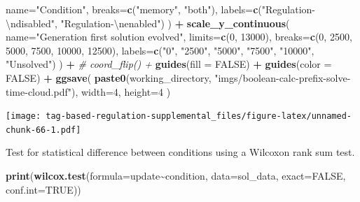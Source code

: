 \documentclass[
]{book}
\newenvironment{Shaded}{\begin{snugshade}}{\end{snugshade}}
\newcommand{\CharTok}[1]{\textcolor[rgb]{0.31,0.60,0.02}{#1}}
\newcommand{\CommentTok}[1]{\textcolor[rgb]{0.56,0.35,0.01}{\textit{#1}}}
\newcommand{\DataTypeTok}[1]{\textcolor[rgb]{0.13,0.29,0.53}{#1}}
\newcommand{\DecValTok}[1]{\textcolor[rgb]{0.00,0.00,0.81}{#1}}
\newcommand{\KeywordTok}[1]{\textcolor[rgb]{0.13,0.29,0.53}{\textbf{#1}}}
\newcommand{\NormalTok}[1]{#1}
\newcommand{\OperatorTok}[1]{\textcolor[rgb]{0.81,0.36,0.00}{\textbf{#1}}}
\newcommand{\OtherTok}[1]{\textcolor[rgb]{0.56,0.35,0.01}{#1}}
\newcommand{\StringTok}[1]{\textcolor[rgb]{0.31,0.60,0.02}{#1}}
\begin{document}
\begin{Shaded}
\begin{Highlighting}[]
    \DataTypeTok{name=}\StringTok{"Condition"}\NormalTok{,}
    \DataTypeTok{breaks=}\KeywordTok{c}\NormalTok{(}\StringTok{"memory"}\NormalTok{, }\StringTok{"both"}\NormalTok{),}
    \DataTypeTok{labels=}\KeywordTok{c}\NormalTok{(}\StringTok{"Regulation{-}}\CharTok{\textbackslash{}n}\StringTok{disabled"}\NormalTok{, }\StringTok{"Regulation{-}}\CharTok{\textbackslash{}n}\StringTok{enabled"}\NormalTok{)}
\NormalTok{  ) }\OperatorTok{+}
\StringTok{  }\KeywordTok{scale\_y\_continuous}\NormalTok{(}
    \DataTypeTok{name=}\StringTok{"Generation first solution evolved"}\NormalTok{,}
    \DataTypeTok{limits=}\KeywordTok{c}\NormalTok{(}\DecValTok{0}\NormalTok{, }\DecValTok{13000}\NormalTok{),}
    \DataTypeTok{breaks=}\KeywordTok{c}\NormalTok{(}\DecValTok{0}\NormalTok{, }\DecValTok{2500}\NormalTok{, }\DecValTok{5000}\NormalTok{, }\DecValTok{7500}\NormalTok{, }\DecValTok{10000}\NormalTok{, }\DecValTok{12500}\NormalTok{),}
    \DataTypeTok{labels=}\KeywordTok{c}\NormalTok{(}\StringTok{"0"}\NormalTok{, }\StringTok{"2500"}\NormalTok{, }\StringTok{"5000"}\NormalTok{, }\StringTok{"7500"}\NormalTok{, }\StringTok{"10000"}\NormalTok{, }\StringTok{"Unsolved"}\NormalTok{)}
\NormalTok{  ) }\OperatorTok{+}
\StringTok{  }\CommentTok{\# coord\_flip() +}
\StringTok{  }\KeywordTok{guides}\NormalTok{(}\DataTypeTok{fill =} \OtherTok{FALSE}\NormalTok{) }\OperatorTok{+}
\StringTok{  }\KeywordTok{guides}\NormalTok{(}\DataTypeTok{color =} \OtherTok{FALSE}\NormalTok{) }\OperatorTok{+}
\StringTok{  }\KeywordTok{ggsave}\NormalTok{(}
    \KeywordTok{paste0}\NormalTok{(working\_directory, }\StringTok{"imgs/boolean{-}calc{-}prefix{-}solve{-}time{-}cloud.pdf"}\NormalTok{),}
    \DataTypeTok{width=}\DecValTok{4}\NormalTok{,}
    \DataTypeTok{height=}\DecValTok{4}
\NormalTok{  )}
\end{Highlighting}
\end{Shaded}

\texttt{[image: tag-based-regulation-supplemental\_files/figure-latex/unnamed-chunk-66-1.pdf]}

Test for statistical difference between conditions using a Wilcoxon rank sum test.

\begin{Shaded}
\begin{Highlighting}[]
\KeywordTok{print}\NormalTok{(}\KeywordTok{wilcox.test}\NormalTok{(}\DataTypeTok{formula=}\NormalTok{update}\OperatorTok{\textasciitilde{}}\NormalTok{condition, }\DataTypeTok{data=}\NormalTok{sol\_data, }\DataTypeTok{exact=}\OtherTok{FALSE}\NormalTok{, }\DataTypeTok{conf.int=}\OtherTok{TRUE}\NormalTok{))}
\end{Highlighting}
\end{Shaded}
\end{document}
